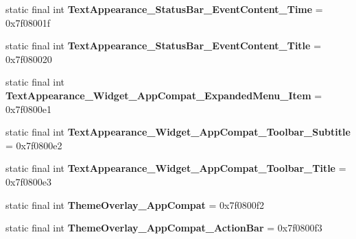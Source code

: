 \begin{DoxyCompactItemize}
\item 
\hypertarget{classandroid_1_1support_1_1design_1_1_r_1_1style_a6eb511649f8dd52cc370222ab9be0cca}{}static final int {\bfseries Text\+Appearance\+\_\+\+Status\+Bar\+\_\+\+Event\+Content\+\_\+\+Time} = 0x7f08001f\label{classandroid_1_1support_1_1design_1_1_r_1_1style_a6eb511649f8dd52cc370222ab9be0cca}

\item 
\hypertarget{classandroid_1_1support_1_1design_1_1_r_1_1style_a095d53ab5cb0c98936105ccebb019a28}{}static final int {\bfseries Text\+Appearance\+\_\+\+Status\+Bar\+\_\+\+Event\+Content\+\_\+\+Title} = 0x7f080020\label{classandroid_1_1support_1_1design_1_1_r_1_1style_a095d53ab5cb0c98936105ccebb019a28}

\item 
\hypertarget{classandroid_1_1support_1_1design_1_1_r_1_1style_a3d3c649896fe547217bf1e3a5f7c2c2e}{}static final int {\bfseries Text\+Appearance\+\_\+\+Widget\+\_\+\+App\+Compat\+\_\+\+Expanded\+Menu\+\_\+\+Item} = 0x7f0800e1\label{classandroid_1_1support_1_1design_1_1_r_1_1style_a3d3c649896fe547217bf1e3a5f7c2c2e}

\item 
\hypertarget{classandroid_1_1support_1_1design_1_1_r_1_1style_ab87eda6737968b821619555803a66662}{}static final int {\bfseries Text\+Appearance\+\_\+\+Widget\+\_\+\+App\+Compat\+\_\+\+Toolbar\+\_\+\+Subtitle} = 0x7f0800e2\label{classandroid_1_1support_1_1design_1_1_r_1_1style_ab87eda6737968b821619555803a66662}

\item 
\hypertarget{classandroid_1_1support_1_1design_1_1_r_1_1style_ad45bedf9c7a7f9f80fc30792d23c9998}{}static final int {\bfseries Text\+Appearance\+\_\+\+Widget\+\_\+\+App\+Compat\+\_\+\+Toolbar\+\_\+\+Title} = 0x7f0800e3\label{classandroid_1_1support_1_1design_1_1_r_1_1style_ad45bedf9c7a7f9f80fc30792d23c9998}

\item 
\hypertarget{classandroid_1_1support_1_1design_1_1_r_1_1style_ae88528ab7b6fb65a2a96bef866a513ea}{}static final int {\bfseries Theme\+Overlay\+\_\+\+App\+Compat} = 0x7f0800f2\label{classandroid_1_1support_1_1design_1_1_r_1_1style_ae88528ab7b6fb65a2a96bef866a513ea}

\item 
\hypertarget{classandroid_1_1support_1_1design_1_1_r_1_1style_ab6f6f318923271179ec1e4216744016d}{}static final int {\bfseries Theme\+Overlay\+\_\+\+App\+Compat\+\_\+\+Action\+Bar} = 0x7f0800f3\label{classandroid_1_1support_1_1design_1_1_r_1_1style_ab6f6f318923271179ec1e4216744016d}


\end{DoxyCompactItemize}
